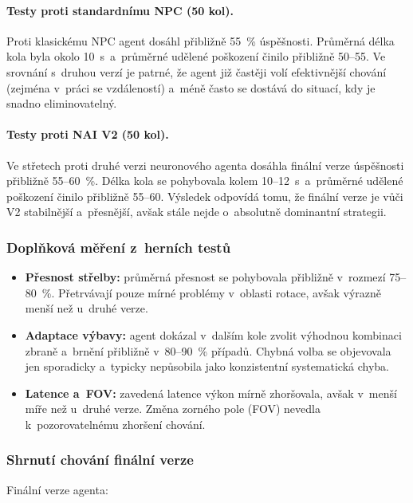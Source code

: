 \paragraph{Testy proti standardnímu NPC (50 kol).}
Proti klasickému NPC agent dosáhl přibližně 55~\% úspěšnosti. Průměrná délka kola byla okolo 10~s~a~průměrné udělené poškození činilo přibližně 50--55. Ve srovnání s~druhou verzí je patrné, že agent již častěji volí efektivnější chování (zejména v~práci se vzdáleností) a~méně často se dostává do situací, kdy je snadno eliminovatelný.

\paragraph{Testy proti NAI V2 (50 kol).}
Ve střetech proti druhé verzi neuronového agenta dosáhla finální verze úspěšnosti přibližně 55--60~\%. Délka kola se pohybovala kolem 10--12~s~a~průměrné udělené poškození činilo přibližně 55--60. Výsledek odpovídá tomu, že finální verze je vůči V2 stabilnější a~přesnější, avšak stále nejde o~absolutně dominantní strategii.

\subsubsection{Doplňková měření z~herních testů}

\begin{itemize}
    \item \textbf{Přesnost střelby:} průměrná přesnost se pohybovala přibližně v~rozmezí 75--80~\%. Přetrvávají pouze mírné problémy v~oblasti rotace, avšak výrazně menší než u~druhé verze.
    \item \textbf{Adaptace výbavy:} agent dokázal v~dalším kole zvolit výhodnou kombinaci zbraně a~brnění přibližně v~80--90~\% případů. Chybná volba se objevovala jen sporadicky a~typicky nepůsobila jako konzistentní systematická chyba.
    \item \textbf{Latence a~FOV:} zavedená latence výkon mírně zhoršovala, avšak v~menší míře než u~druhé verze. Změna zorného pole (FOV) nevedla k~pozorovatelnému zhoršení chování.
\end{itemize}

\subsubsection{Shrnutí chování finální verze}

Finální verze agenta:

